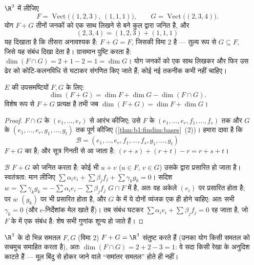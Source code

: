 \begin{example}
\label{ex:b1:findim:sumconcat}
$\R^3$ में लीजिए
\[
F = \operatorname{Vect}\bigl((1,2,3),\ (1,1,1)\bigr),
\qquad
G = \operatorname{Vect}\bigl((2,3,4)\bigr) .
\]
योग $F + G$ तीनों जनकों को एक साथ लिखने से बने कुल द्वारा जनित है, और
\[
(2, 3, 4) = (1, 2, 3) + (1, 1, 1)
\]
यह दिखाता है कि तीसरा अनावश्यक है: $F + G = F$, जिसकी विमा $2$ है --- तुल्य
रूप से $G \subseteq F$, जिसे यह संबंध दिखा देता है। ग्रासमान पुष्टि करता है:
$\dim(F \cap G) = 2 + 1 - 2 = 1 = \dim G$। योग जनकों को एक साथ लिखकर और फिर
उस ढेर को कोटि-कलनविधि से घटाकर संगणित किए जाते हैं; कोई नई तकनीक कभी नहीं
चाहिए।
\end{example}

\begin{theorem}[ग्रासमान का सूत्र]\label{thm:b1:findim:grassmann}
$E$ की  उपसमष्टियों $F, G$ के लिए:
\[
\dim(F + G) = \dim F + \dim G - \dim(F \cap G) .
\]
विशेष रूप से $F + G$ प्रत्यक्ष है तभी जब $\dim(F + G) = \dim F + \dim G$।
\end{theorem}

\begin{proof}
$F \cap G$ के  $(e_1, \dots, e_r)$ से आरंभ कीजिए; उसे $F$ के  $(e_1,
\dots, e_r, f_1, \dots, f_s)$ तक और $G$ के  $(e_1, \dots, e_r, g_1,
\dots, g_t)$ तक पूर्ण कीजिए (\cref{thm:b1:findim:bases}~(2))। हमारा दावा है
कि
\[
\mathcal{B} = (e_1, \dots, e_r, f_1, \dots, f_s, g_1, \dots, g_t)
\]
$F + G$ का  है; और सूत्र गिनती से आ जाता है: $(r + s) + (r + t) - r = r
+ s + t$।

$\mathcal{B}$ $F + G$ को जनित करता है: कोई भी $u + v$ ($u \in F$, $v \in G$)
उसके द्वारा प्रसारित हो जाता है। स्वतंत्रता: मान लीजिए $\sum \alpha_i e_i +
\sum \beta_j f_j + \sum \gamma_k g_k = 0$। सदिश $w = \sum \gamma_k g_k =
-\sum\alpha_i e_i - \sum\beta_j f_j$ $G \cap F$ में है, अतः वह अकेले $(e_i)$
पर प्रसारित होता है; पर $w$ $(g_k)$ पर भी प्रसारित होता है, और $G$ के 
में ये दोनों व्यंजक एक ही होने चाहिए: अतः सभी $\gamma_k = 0$ (और
$e$-निर्देशांक मेल खाते हैं)। तब संबंध घटकर $\sum\alpha_i e_i + \sum\beta_j
f_j = 0$ रह जाता है, जो $F$ के  में एक संबंध है: शेष सभी गुणांक शून्य हो
जाते हैं।
\end{proof}

\begin{example}\label{ex:b1:findim:planes}
$\R^3$ के दो भिन्न समतल $F, G$ (विमा $2$) $F + G = \R^3$ संतुष्ट करते हैं
(उनका योग किसी समतल को सचमुच समाहित करता है), अतः $\dim(F \cap G) = 2 + 2 -
3 = 1$: वे सदा किसी रेखा के अनुदिश काटते हैं --- मूल बिंदु से होकर जाने वाले
``समांतर समतल'' होते ही नहीं।
\end{example}

